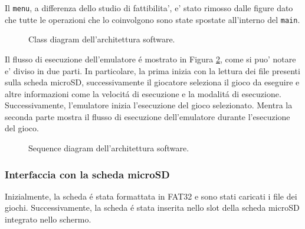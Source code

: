 \documentclass[a4paper]{article}
\begin{document}
Il \texttt{menu}, a differenza dello studio di fattibilita', e' stato rimosso dalle figure dato che tutte le operazioni che lo coinvolgono sono state spostate all'interno del \texttt{main}.

\begin{figure}[h!t]
    \begin{center}
        \begin{tikzpicture}[scale=0.6, transform shape]
            
        \end{tikzpicture}
    \end{center}
    \caption{
        Class diagram dell'architettura software.
    }
    \label{fig:class_diagram}
\end{figure}

Il flusso di esecuzione dell'emulatore é mostrato in Figura \ref{fig:sequence_diagram}, come si puo' notare e' diviso in due parti. In particolare, la prima inizia con la lettura dei file presenti sulla scheda microSD, successivamente il giocatore seleziona il gioco da eseguire e altre informazioni come la velocitá di esecuzione e la modalitá di esecuzione. Successivamente, l'emulatore inizia l'esecuzione del gioco selezionato. Mentra la seconda parte mostra il flusso di esecuzione dell'emulatore durante l'esecuzione del gioco.

\begin{figure}[h!t]
    \begin{center}
        
    \end{center}
    \caption{
        Sequence diagram dell'architettura software.
    }
    \label{fig:sequence_diagram}
\end{figure}

\subsubsection{Interfaccia con la scheda microSD}\label{subsubsec:sd}

Inizialmente, la scheda é stata formattata in FAT32 e sono stati caricati i file dei giochi. Successivamente, la scheda é stata inserita nello slot della scheda microSD integrato nello schermo.

\begin{Listing}[h!t] %
    \centering
    \caption{Caricamento di un gioco dalla scheda microSD.}
    \label{load_game}
\end{Listing}
\end{document}
